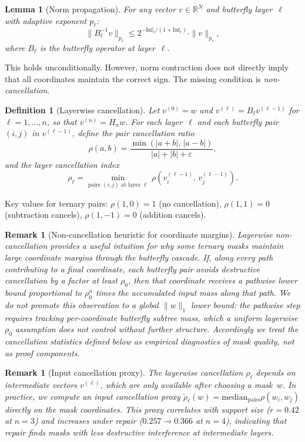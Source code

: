 \documentclass[11pt]{article}
\newtheorem{lemma}[theorem]{Lemma}
\newtheorem{definition}[theorem]{Definition}
\newtheorem{remark}[theorem]{Remark}
\newcommand{\R}{\mathbb{R}}
\newcommand{\Inf}{\mathrm{Inf}}
\begin{document}
\begin{lemma}[Norm propagation]
\label{lem:norm_prop}
For any vector $v \in \R^N$ and butterfly layer~$\ell$ with adaptive exponent $p_\ell$:
\[
\|B_\ell^{-1} v\|_{p_\ell} \le 2^{-\Inf_\ell/(1+\Inf_\ell)} \cdot \|v\|_{p_\ell},
\]
where $B_\ell$ is the butterfly operator at layer~$\ell$.
\end{lemma}

This holds unconditionally. However, norm contraction does not directly imply that all coordinates maintain the correct sign. The missing condition is \emph{non-cancellation}.

\begin{definition}[Layerwise cancellation]
\label{def:cancellation}
Let $v^{(0)} = w$ and $v^{(\ell)} = B_\ell v^{(\ell-1)}$ for $\ell = 1, \ldots, n$, so that $v^{(n)} = H_n w$. For each layer~$\ell$ and each butterfly pair $(i, j)$ in $v^{(\ell-1)}$, define the \emph{pair cancellation ratio}
\[
\rho(a, b) = \frac{\min(|a + b|,\, |a - b|)}{|a| + |b| + \varepsilon},
\]
and the \emph{layer cancellation index}
\[
\rho_\ell = \min_{\text{pairs } (i,j) \text{ at layer } \ell}\, \rho(v^{(\ell-1)}_i,\, v^{(\ell-1)}_j).
\]
\end{definition}

Key values for ternary pairs: $\rho(1, 0) = 1$ (no cancellation), $\rho(1, 1) = 0$ (subtraction cancels), $\rho(1, -1) = 0$ (addition cancels).

\begin{remark}[Non-cancellation heuristic for coordinate margins]
\label{rem:coord_margin_heuristic}
Layerwise non-cancellation provides a useful intuition for why some ternary masks maintain large coordinate margins through the butterfly cascade. If, along every path contributing to a final coordinate, each butterfly pair avoids destructive cancellation by a factor at least $\rho_0$, then that coordinate receives a pathwise lower bound proportional to $\rho_0^n$ times the accumulated input mass along that path. We do not promote this observation to a global $\|w\|_1$ lower bound: the pathwise step requires tracking per-coordinate butterfly subtree mass, which a uniform layerwise $\rho_0$ assumption does not control without further structure. Accordingly we treat the cancellation statistics defined below as \emph{empirical diagnostics} of mask quality, not as proof components.
\end{remark}

\begin{remark}[Input cancellation proxy]
\label{rem:proxy}
The layerwise cancellation $\rho_\ell$ depends on intermediate vectors $v^{(\ell)}$, which are only available \emph{after} choosing a mask~$w$. In practice, we compute an \emph{input cancellation proxy} $\tilde{\rho}_\ell(w) = \mathrm{median}_{\text{pairs}} \rho(w_i, w_j)$ directly on the mask coordinates. This proxy correlates with support size ($r = 0.42$ at $n=3$) and increases under repair ($0.257 \to 0.366$ at $n=4$), indicating that repair finds masks with less destructive interference at intermediate layers.
\end{remark}
\end{document}
